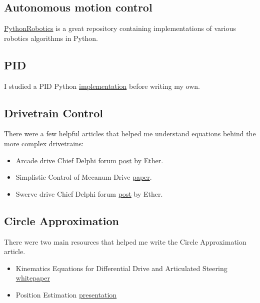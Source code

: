 \documentclass[12pt,twoside]{article}
\begin{document}
\subsection{Autonomous motion control}
\href{https://github.com/AtsushiSakai/PythonRobotics}{PythonRobotics} is a great repository containing implementations of various robotics algorithms in Python.

\subsection{PID}
I studied a PID Python \href{https://github.com/ivmech/ivPID}{implementation} before writing my own.

\subsection{Drivetrain Control}
There were a few helpful articles that helped me understand equations behind the more complex drivetrains:
\begin{itemize}
\item Arcade drive Chief Delphi forum \href{https://www.chiefdelphi.com/media/papers/2661}{post} by Ether.
\item Simplistic Control of Mecanum Drive \href{https://forums.parallax.com/discussion/download/79828/ControllingMecanumDrive\%255B1\%255D.pdf&sa=U&ved=0ahUKEwiX5LzFiNrfAhVswYsKHTofDrwQFggEMAA&client=internal-uds-cse&cx=002870150170079142498:hq1zjyfbawy&usg=AOvVaw19D74YD--M3YmQ2MGd1rTg}{paper}.
\item Swerve drive Chief Delphi forum \href{https://www.chiefdelphi.com/t/paper-4-wheel-independent-drive-independent-steering-swerve/107383}{post} by Ether.
\end{itemize}\vspace{\parskip}

\subsection{Circle Approximation}
There were two main resources that helped me write the Circle Approximation article.
\begin{itemize}
\item Kinematics Equations for Differential Drive and Articulated Steering \href{http://www8.cs.umu.se/kurser/5DV122/HT13/material/Hellstrom-ForwardKinematics.pdf}{whitepaper}
\item Position Estimation \href{http://people.scs.carleton.ca/~lanthier/teaching/COMP4807/Notes/5\%20-\%20PositionEstimation.pdf}{presentation}
\end{itemize}\vspace{\parskip}
\end{document}
